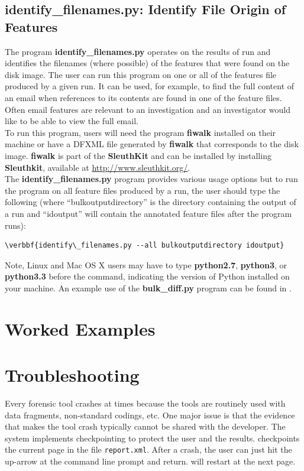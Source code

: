 \documentclass[11pt]{article} %
\begin{document}
\subsection{identify\_filenames.py: Identify File Origin of Features}
The program \textbf{identify\_filenames.py} operates on the results of \bulk run and identifies the filenames (where possible) of the features that were found on the disk image. The user can run this program on one or all of the features file produced by a given run. It can be used, for example, to find the full content of an email when references to its contents are found in one of the feature files. Often email features are relevant to an investigation and an investigator would like to be able to view the full email.\\

To run this program, users will need the program \textbf{fiwalk} installed on their machine or have a DFXML file generated by \textbf{fiwalk} that corresponds to the disk image. \textbf{fiwalk} is part of the \textbf{SleuthKit} and can be installed by installing \textbf{Sleuthkit}, available at \url{http://www.sleuthkit.org/}.\\

The \textbf{identify\_filenames.py} program provides various usage options but to run the program on all feature files produced by a \bulk run, the user should type the following (where ``bulkoutputdirectory'' is the directory containing the output of a \bulk run and ``idoutput'' will contain the annotated feature files after the program runs):
\begin{Verbatim}[commandchars=\\\{\}]
\verbbf{identify\_filenames.py --all bulkoutputdirectory idoutput}
\end{Verbatim} 
Note, Linux and Mac OS X users may have to type \textbf{python2.7}, \textbf{python3}, or \textbf{python3.3} before the command, indicating the version of Python installed on your machine.  An example use of the \textbf{bulk\_diff.py} program can be found in .

\section{Worked Examples}
\label{Examples}


\section{Troubleshooting}
\label{DebuggingBulk}
Every forensic tool crashes at times because the tools are routinely used with data fragments, non-standard codings, etc. One major issue is that the evidence that makes the tool crash typically cannot be shared with the developer. The \bulk system implements checkpointing to protect the user and the results. \bulk checkpoints the current page in the file \texttt{report.xml}. After a crash, the user can just hit the up-arrow at the command line prompt and return. \bulk will restart at the next page. \\
\end{document}
